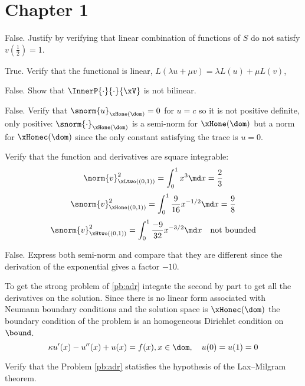 
\section{Chapter 1}

\begin{tmasltn}{1.1}
\begin{tmatsks}
\item False. Justify by verifying that linear combination of functions of $S$ do not satisfy $v(\frac{1}{2}) = 1$.
\item True. Verify that the functional is linear, $L(\lambda u + \mu v) = \lambda L(u) + \mu L(v)$,
\item False. Show that $\InnerP{\cdot}{\cdot}{\xV}$ is not bilinear.
\item False. Verify that $\snorm{u}_{\xHone(\dom)} = 0$ for $u = c$ so it is not positive definite, only positive: $\snorm{\cdot}_{\xHone(\dom)}$ is a semi-norm for $\xHone(\dom)$ but a norm for $\xHonec(\dom)$ since the only constant satisfying the trace is $u = 0$.
\item Verify that the function and derivatives are square integrable:
\begin{equation*}
 \norm{v}^2_{\xLtwo((0,1))} = \int_{0}^{1} x^3 \md x = \frac{2}{3}
\end{equation*}
\begin{equation*}
 \snorm{v}^2_{\xHone((0,1))} = \int_{0}^{1} \frac{9}{16} x^{-1/2} \md x = \frac{9}{8}
\end{equation*}
\begin{equation*}
 \snorm{v}^2_{\xHtwo((0,1))} = \int_{0}^{1} \frac{-9}{32} x^{-3/2} \md x\quad \mbox{not bounded}
\end{equation*}
\item False. Express both semi-norm and compare that they are different since the derivation of the exponential gives a factor $-10$.
\end{tmatsks}
\end{tmasltn}

\begin{tmasltn}{1.2}
\begin{tmatsks}
\item To get the strong problem of \eqref{pb:adr} integate the second by part to get all the derivatives on the solution. Since there is no linear form associated with Neumann boundary conditions and the solution space is $\xHonec(\dom)$ the boundary condition of the problem is an homogeneous Dirichlet condition on $\bound$.
\begin{equation*}
 \kappa u'(x) - u''(x) + u(x) = f(x), x\in\dom,\quad u(0) = u(1) = 0
\end{equation*}
\item Verify that the Problem \eqref{pb:adr} statisfies the hypothesis of the Lax--Milgram theorem.
\end{tmatsks}
\end{tmasltn}

